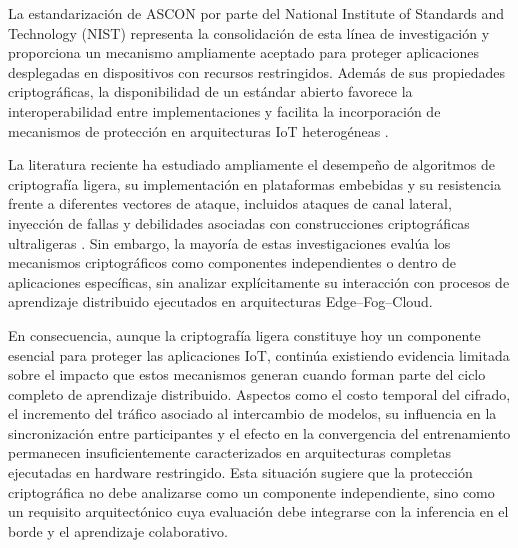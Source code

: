 \documentclass[journal,article,submit,moreauthors]{Definitions/mdpi}
\begin{document}
La estandarización de ASCON por parte del National Institute of Standards and Technology (NIST) representa la consolidación de esta línea de investigación y proporciona un mecanismo ampliamente aceptado para proteger aplicaciones desplegadas en dispositivos con recursos restringidos. Además de sus propiedades criptográficas, la disponibilidad de un estándar abierto favorece la interoperabilidad entre implementaciones y facilita la incorporación de mecanismos de protección en arquitecturas IoT heterogéneas \cite{NIST800232,Kaur2025}.

La literatura reciente ha estudiado ampliamente el desempeño de algoritmos de criptografía ligera, su implementación en plataformas embebidas y su resistencia frente a diferentes vectores de ataque, incluidos ataques de canal lateral, inyección de fallas y debilidades asociadas con construcciones criptográficas ultraligeras \cite{Kaur2025,Mirzaali2025,Gusita2025}. Sin embargo, la mayoría de estas investigaciones evalúa los mecanismos criptográficos como componentes independientes o dentro de aplicaciones específicas, sin analizar explícitamente su interacción con procesos de aprendizaje distribuido ejecutados en arquitecturas Edge--Fog--Cloud.
%

En consecuencia, aunque la criptografía ligera constituye hoy un componente esencial para proteger las aplicaciones IoT, continúa existiendo evidencia limitada sobre el impacto que estos mecanismos generan cuando forman parte del ciclo completo de aprendizaje distribuido. Aspectos como el costo temporal del cifrado, el incremento del tráfico asociado al intercambio de modelos, su influencia en la sincronización entre participantes y el efecto en la convergencia del entrenamiento permanecen insuficientemente caracterizados en arquitecturas completas ejecutadas en hardware restringido. Esta situación sugiere que la protección criptográfica no debe analizarse como un componente independiente, sino como un requisito arquitectónico cuya evaluación debe integrarse con la inferencia en el borde y el aprendizaje colaborativo.
%
\end{document}
